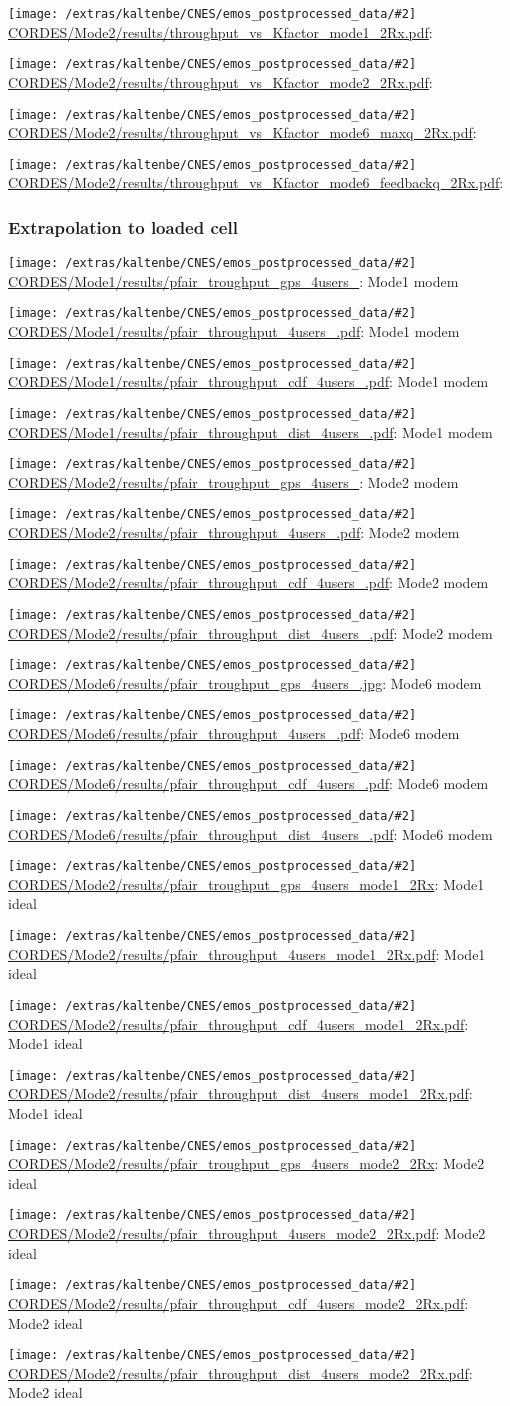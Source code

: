 \documentclass[a4paper,10pt]{article}
\newcommand{\printfile}[2][]{
 \begin{minipage}{8cm}
  \centering
  \texttt{[image: /extras/kaltenbe/CNES/emos\_postprocessed\_data/\#2]}
  \url{#2}: #1

 \end{minipage}
}
\begin{document}
\printfile{CORDES/Mode2/results/throughput_vs_Kfactor_mode1_2Rx.pdf}
\printfile{CORDES/Mode2/results/throughput_vs_Kfactor_mode2_2Rx.pdf}

\printfile{CORDES/Mode2/results/throughput_vs_Kfactor_mode6_maxq_2Rx.pdf}
\printfile{CORDES/Mode2/results/throughput_vs_Kfactor_mode6_feedbackq_2Rx.pdf}


\subsubsection{Extrapolation to loaded cell}

\printfile[Mode1 modem]{CORDES/Mode1/results/pfair_troughput_gps_4users_}
\printfile[Mode1 modem]{CORDES/Mode1/results/pfair_throughput_4users_.pdf}

\printfile[Mode1 modem]{CORDES/Mode1/results/pfair_throughput_cdf_4users_.pdf}
\printfile[Mode1 modem]{CORDES/Mode1/results/pfair_throughput_dist_4users_.pdf}

\printfile[Mode2 modem]{CORDES/Mode2/results/pfair_troughput_gps_4users_}
\printfile[Mode2 modem]{CORDES/Mode2/results/pfair_throughput_4users_.pdf}

\printfile[Mode2 modem]{CORDES/Mode2/results/pfair_throughput_cdf_4users_.pdf}
\printfile[Mode2 modem]{CORDES/Mode2/results/pfair_throughput_dist_4users_.pdf}

\printfile[Mode6 modem]{CORDES/Mode6/results/pfair_troughput_gps_4users_.jpg}
\printfile[Mode6 modem]{CORDES/Mode6/results/pfair_throughput_4users_.pdf}

\printfile[Mode6 modem]{CORDES/Mode6/results/pfair_throughput_cdf_4users_.pdf}
\printfile[Mode6 modem]{CORDES/Mode6/results/pfair_throughput_dist_4users_.pdf}

\printfile[Mode1 ideal]{CORDES/Mode2/results/pfair_troughput_gps_4users_mode1_2Rx}
\printfile[Mode1 ideal]{CORDES/Mode2/results/pfair_throughput_4users_mode1_2Rx.pdf}

\printfile[Mode1 ideal]{CORDES/Mode2/results/pfair_throughput_cdf_4users_mode1_2Rx.pdf}
\printfile[Mode1 ideal]{CORDES/Mode2/results/pfair_throughput_dist_4users_mode1_2Rx.pdf}

\printfile[Mode2 ideal]{CORDES/Mode2/results/pfair_troughput_gps_4users_mode2_2Rx}
\printfile[Mode2 ideal]{CORDES/Mode2/results/pfair_throughput_4users_mode2_2Rx.pdf}

\printfile[Mode2 ideal]{CORDES/Mode2/results/pfair_throughput_cdf_4users_mode2_2Rx.pdf}
\printfile[Mode2 ideal]{CORDES/Mode2/results/pfair_throughput_dist_4users_mode2_2Rx.pdf}
\end{document}
